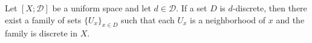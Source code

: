Let $[X; \mathcal{D}]$ be a uniform space and let $d \in \mathcal{D}$. If a set $D$ is $d$-discrete, then there exist a family of sets $\{U_x\}_{x \in D}$ such that each $U_x$ is a neighborhood of $x$ and the family is discrete in $X$.

